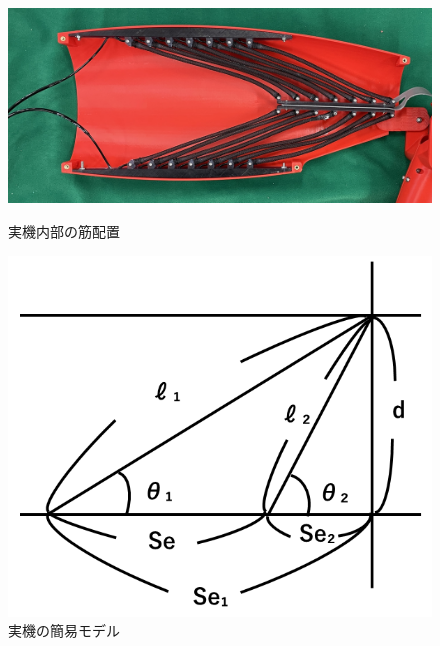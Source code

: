 \documentclass{jarticle}
\begin{document}
\begin{figure}[t]
  \begin{minipage}[b]{0.47\columnwidth}
    \centering
    \includegraphics[scale=0.03]{image/crabmuscle.jpg}
    \vspace{2mm}
    \caption{実機内部の筋配置}
    \label{fig:muscle}
  \end{minipage}
  \hspace{0.04\columnwidth}
  \begin{minipage}[b]{0.45\columnwidth}
    \centering
    \includegraphics[scale=0.18]{image/keisan_1.png}
    \vspace{-4.5mm}
    \caption{実機の簡易モデル}
    \label{fig:keisan_1}
  \end{minipage}
\end{figure}
\vspace*{-4mm}
\end{document}
